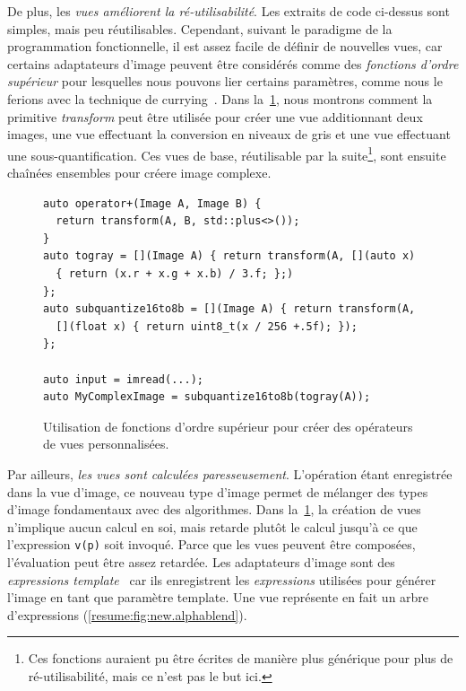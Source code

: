 De plus, les \emph{vues améliorent la ré-utilisabilité}. Les extraits de code ci-dessus sont simples, mais peu
réutilisables. Cependant, suivant le paradigme de la programmation fonctionnelle, il est assez facile de définir de
nouvelles vues, car certains adaptateurs d'image peuvent être considérés comme des \emph{fonctions d'ordre supérieur}
pour lesquelles nous pouvons lier certains paramètres, comme nous le ferions avec la technique de
currying~\parencite{hanus.1995.curry}. Dans la~\cref{resume:fig:view.highorder}, nous montrons comment la primitive
\emph{transform} peut être utilisée pour créer une vue additionnant deux images, une vue effectuant la conversion en
niveaux de gris et une vue effectuant une sous-quantification. Ces vues de base, réutilisable par la suite\footnote{Ces
  fonctions auraient pu être écrites de manière plus générique pour plus de ré-utilisabilité, mais ce n'est pas le but
  ici.}, sont ensuite chaînées ensembles pour créere image complexe.

\begin{figure}
  \begin{verbatim}
auto operator+(Image A, Image B) {
  return transform(A, B, std::plus<>());
}
auto togray = [](Image A) { return transform(A, [](auto x)
  { return (x.r + x.g + x.b) / 3.f; };)
};
auto subquantize16to8b = [](Image A) { return transform(A,
  [](float x) { return uint8_t(x / 256 +.5f); });
};

auto input = imread(...);
auto MyComplexImage = subquantize16to8b(togray(A));
  \end{verbatim}

  \caption[]{Utilisation de fonctions d'ordre supérieur pour créer des opérateurs de vues personnalisées.}
  \label{resume:fig:view.highorder}
\end{figure}

Par ailleurs, \emph{les vues sont calculées paresseusement}. L'opération étant enregistrée dans la vue d'image, ce
nouveau type d'image permet de mélanger des types d'image fondamentaux avec des algorithmes. Dans
la~\cref{resume:fig:view.highorder}, la création de vues n'implique aucun calcul en soi, mais retarde plutôt le calcul
jusqu'à ce que l'expression \texttt{v(p)} soit invoqué. Parce que les vues peuvent être composées, l'évaluation peut
être assez retardée. Les adaptateurs d'image sont des \emph{expressions template}~\parencite{veldhuizen.1995.expression,
  veldhuizen.2000.blitz} car ils enregistrent les \emph{expressions} utilisées pour générer l'image en tant que paramètre
template. Une vue représente en fait un arbre d'expressions (\cref{resume:fig:new.alphablend}).

